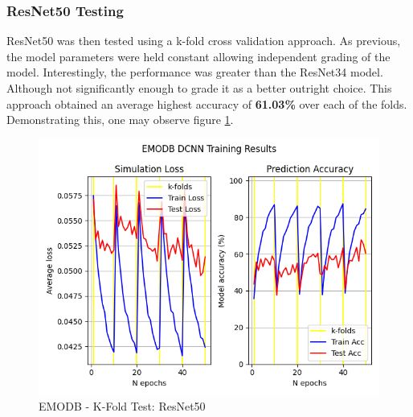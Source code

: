 \subsubsection{ResNet50 Testing}
ResNet50 was then tested using a k-fold cross validation approach. As previous, the model parameters were held constant allowing independent grading of the model. Interestingly, the performance was greater than the ResNet34 model. Although not significantly enough to grade it as a better outright choice. This approach obtained an average highest accuracy of \textbf{61.03\%} over each of the folds. Demonstrating this, one may observe figure \ref{pilot_r50_fig}.
\begin{figure}[ht]
        \centering
        \includegraphics[scale = 0.6]{images_results/EMODB-FinalResults/EMODB_TrainResults_30-05__19-58.png}
        \caption{EMODB - K-Fold Test: ResNet50}
        \label{pilot_r50_fig}
\end{figure}

